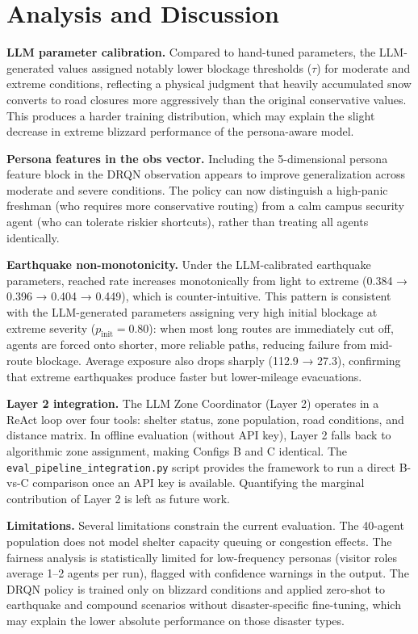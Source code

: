 \documentclass[11pt]{article}
\begin{document}
\section{Analysis and Discussion}

\textbf{LLM parameter calibration.} Compared to hand-tuned parameters, the LLM-generated values assigned notably lower blockage thresholds ($\tau$) for moderate and extreme conditions, reflecting a physical judgment that heavily accumulated snow converts to road closures more aggressively than the original conservative values. This produces a harder training distribution, which may explain the slight decrease in extreme blizzard performance of the persona-aware model.

\textbf{Persona features in the obs vector.} Including the 5-dimensional persona feature block in the DRQN observation appears to improve generalization across moderate and severe conditions. The policy can now distinguish a high-panic freshman (who requires more conservative routing) from a calm campus security agent (who can tolerate riskier shortcuts), rather than treating all agents identically.

\textbf{Earthquake non-monotonicity.} Under the LLM-calibrated earthquake parameters, reached rate increases monotonically from light to extreme (0.384 → 0.396 → 0.404 → 0.449), which is counter-intuitive. This pattern is consistent with the LLM-generated parameters assigning very high initial blockage at extreme severity ($p_{\mathrm{init}} = 0.80$): when most long routes are immediately cut off, agents are forced onto shorter, more reliable paths, reducing failure from mid-route blockage. Average exposure also drops sharply (112.9 → 27.3), confirming that extreme earthquakes produce faster but lower-mileage evacuations.

\textbf{Layer 2 integration.} The LLM Zone Coordinator (Layer 2) operates in a ReAct loop over four tools: shelter status, zone population, road conditions, and distance matrix. In offline evaluation (without API key), Layer 2 falls back to algorithmic zone assignment, making Configs B and C identical. The \texttt{eval\_pipeline\_integration.py} script provides the framework to run a direct B-vs-C comparison once an API key is available. Quantifying the marginal contribution of Layer 2 is left as future work.

\textbf{Limitations.} Several limitations constrain the current evaluation. The 40-agent population does not model shelter capacity queuing or congestion effects. The fairness analysis is statistically limited for low-frequency personas (visitor roles average 1--2 agents per run), flagged with confidence warnings in the output. The DRQN policy is trained only on blizzard conditions and applied zero-shot to earthquake and compound scenarios without disaster-specific fine-tuning, which may explain the lower absolute performance on those disaster types.
\end{document}
